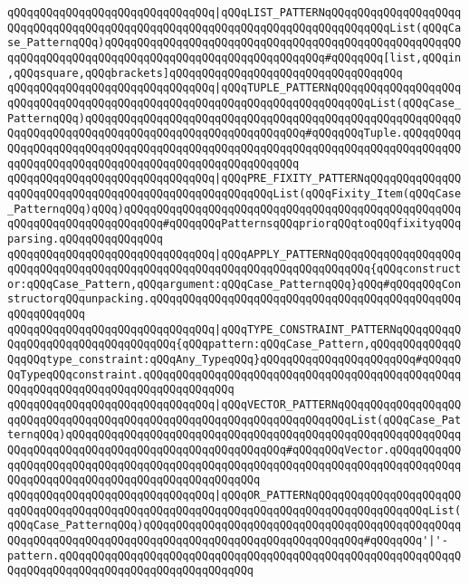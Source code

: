 \verb|qQQqqQQqqQQqqQQqqQQqqQQqqQQqqQQq|\verb#|qQQqLIST_PATTERNqQQqqQQqqQQqqQQqqQQqqQQqqQQqqQQqqQQqqQQqqQQqqQQqqQQqqQQqqQQqqQQqqQQqqQQqqQQqqQQqList(qQQqCase_PatternqQQq)qQQqqQQqqQQqqQQqqQQqqQQqqQQqqQQqqQQqqQQqqQQqqQQqqQQqqQQqqQQqqQQqqQQqqQQqqQQqqQQqqQQqqQQqqQQqqQQqqQQqqQQq#\verb|#qQQqqQQq[list,qQQqin,qQQqsquare,qQQqbrackets]qQQqqQQqqQQqqQQqqQQqqQQqqQQqqQQqqQQq|\newline
\verb|qQQqqQQqqQQqqQQqqQQqqQQqqQQqqQQq|\verb#|qQQqTUPLE_PATTERNqQQqqQQqqQQqqQQqqQQqqQQqqQQqqQQqqQQqqQQqqQQqqQQqqQQqqQQqqQQqqQQqqQQqqQQqqQQqList(qQQqCase_PatternqQQq)qQQqqQQqqQQqqQQqqQQqqQQqqQQqqQQqqQQqqQQqqQQqqQQqqQQqqQQqqQQqqQQqqQQqqQQqqQQqqQQqqQQqqQQqqQQqqQQqqQQqqQQq#\verb|#qQQqqQQqTuple.qQQqqQQqqQQqqQQqqQQqqQQqqQQqqQQqqQQqqQQqqQQqqQQqqQQqqQQqqQQqqQQqqQQqqQQqqQQqqQQqqQQqqQQqqQQqqQQqqQQqqQQqqQQqqQQqqQQqqQQqqQQq|\newline
\verb|qQQqqQQqqQQqqQQqqQQqqQQqqQQqqQQq|\verb#|qQQqPRE_FIXITY_PATTERNqQQqqQQqqQQqqQQqqQQqqQQqqQQqqQQqqQQqqQQqqQQqqQQqqQQqqQQqList(qQQqFixity_Item(qQQqCase_PatternqQQq)qQQq)qQQqqQQqqQQqqQQqqQQqqQQqqQQqqQQqqQQqqQQqqQQqqQQqqQQqqQQqqQQqqQQqqQQqqQQqqQQq#\verb|#qQQqqQQqPatternsqQQqpriorqQQqtoqQQqfixityqQQqparsing.qQQqqQQqqQQqqQQq|\newline
\verb|qQQqqQQqqQQqqQQqqQQqqQQqqQQqqQQq|\verb#|qQQqAPPLY_PATTERNqQQqqQQqqQQqqQQqqQQqqQQqqQQqqQQqqQQqqQQqqQQqqQQqqQQqqQQqqQQqqQQqqQQqqQQqqQQq{qQQqconstructor:qQQqCase_Pattern,qQQqargument:qQQqCase_PatternqQQq}qQQq#\verb|#qQQqqQQqConstructorqQQqunpacking.qQQqqQQqqQQqqQQqqQQqqQQqqQQqqQQqqQQqqQQqqQQqqQQqqQQqqQQqqQQq|\newline
\verb|qQQqqQQqqQQqqQQqqQQqqQQqqQQqqQQq|\verb#|qQQqTYPE_CONSTRAINT_PATTERNqQQqqQQqqQQqqQQqqQQqqQQqqQQqqQQqqQQq{qQQqpattern:qQQqCase_Pattern,qQQqqQQqqQQqqQQqqQQqtype_constraint:qQQqAny_TypeqQQq}qQQqqQQqqQQqqQQqqQQqqQQq#\verb|#qQQqqQQqTypeqQQqconstraint.qQQqqQQqqQQqqQQqqQQqqQQqqQQqqQQqqQQqqQQqqQQqqQQqqQQqqQQqqQQqqQQqqQQqqQQqqQQqqQQqqQQq|\newline
\verb|qQQqqQQqqQQqqQQqqQQqqQQqqQQqqQQq|\verb#|qQQqVECTOR_PATTERNqQQqqQQqqQQqqQQqqQQqqQQqqQQqqQQqqQQqqQQqqQQqqQQqqQQqqQQqqQQqqQQqqQQqqQQqList(qQQqCase_PatternqQQq)qQQqqQQqqQQqqQQqqQQqqQQqqQQqqQQqqQQqqQQqqQQqqQQqqQQqqQQqqQQqqQQqqQQqqQQqqQQqqQQqqQQqqQQqqQQqqQQqqQQqqQQq#\verb|#qQQqqQQqVector.qQQqqQQqqQQqqQQqqQQqqQQqqQQqqQQqqQQqqQQqqQQqqQQqqQQqqQQqqQQqqQQqqQQqqQQqqQQqqQQqqQQqqQQqqQQqqQQqqQQqqQQqqQQqqQQqqQQqqQQq|\newline
\verb|qQQqqQQqqQQqqQQqqQQqqQQqqQQqqQQq|\verb#|qQQqOR_PATTERNqQQqqQQqqQQqqQQqqQQqqQQqqQQqqQQqqQQqqQQqqQQqqQQqqQQqqQQqqQQqqQQqqQQqqQQqqQQqqQQqqQQqqQQqList(qQQqCase_PatternqQQq)qQQqqQQqqQQqqQQqqQQqqQQqqQQqqQQqqQQqqQQqqQQqqQQqqQQqqQQqqQQqqQQqqQQqqQQqqQQqqQQqqQQqqQQqqQQqqQQqqQQqqQQq#\verb|#qQQqqQQq'|\verb#|'-pattern.qQQqqQQqqQQqqQQqqQQqqQQqqQQqqQQqqQQqqQQqqQQqqQQqqQQqqQQqqQQqqQQqqQQqqQQqqQQqqQQqqQQqqQQqqQQqqQQqqQQq#\newline
